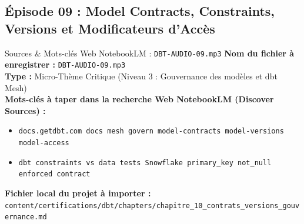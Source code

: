 \documentclass[11pt,a4paper]{article}
\begin{document}
\subsection{Épisode 09 : Model Contracts, Constraints, Versions et Modificateurs d'Accès}
\begin{sourcebox}{Sources \& Mots-clés Web NotebookLM : \texttt{DBT-AUDIO-09.mp3}}
\textbf{Nom du fichier à enregistrer :} \texttt{DBT-AUDIO-09.mp3}\\
\textbf{Type :} Micro-Thème Critique (Niveau 3 : Gouvernance des modèles et dbt Mesh)\\
\textbf{Mots-clés à taper dans la recherche Web NotebookLM (Discover Sources) :}
\begin{itemize}[noitemsep]
    \item \texttt{docs.getdbt.com docs mesh govern model-contracts model-versions model-access}
    \item \texttt{dbt constraints vs data tests Snowflake primary_key not_null enforced contract}
\end{itemize}
\textbf{Fichier local du projet à importer :}
\texttt{content/certifications/dbt/chapters/chapitre_10_contrats_versions_gouvernance.md}
\end{sourcebox}
\end{document}
